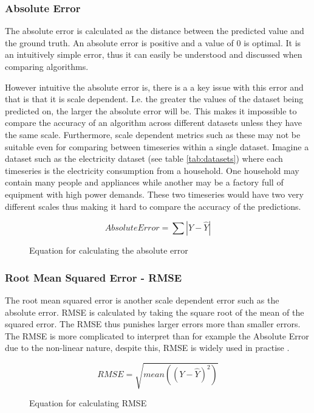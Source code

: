 \subsubsection{Absolute Error}
The absolute error is calculated as the distance between the predicted value and the ground truth. An absolute error is positive and a value of 0 is optimal. It is an intuitively simple error, thus it can easily be understood and discussed when comparing algorithms.

However intuitive the absolute error is, there is a a key issue with this error and that is that it is scale dependent. I.e. the greater the values of the dataset being predicted on, the larger the absolute error will be. This makes it impossible to compare the accuracy of an algorithm across different datasets unless they have the same scale. \cite{hyndman_forecasting_3rd} Furthermore, scale dependent metrics such as these may not be suitable even for comparing between timeseries within a single dataset. Imagine a dataset such as the electricity dataset (see table \ref{tab:datasets}) where each timeseries is the electricity consumption from a household. One household may contain many people and appliances while another may be a factory full of equipment with high power demands. These two timeseries would have two very different scales thus making it hard to compare the accuracy of the predictions.

\begin{figure}[h]
  \[Absolute Error = \sum|Y - \hat{Y}|\]
  \caption{Equation for calculating the absolute error}
  \label{eq:abs_error}
\end{figure}

\subsubsection{Root Mean Squared Error - RMSE}
\label{sec:RMSE}
The root mean squared error is another scale dependent error such as the absolute error. RMSE is calculated by taking the square root of the mean of the squared error. The RMSE thus punishes larger errors more than smaller errors. The RMSE is more complicated to interpret than for example the Absolute Error due to the non-linear nature, despite this, RMSE is widely used in practise \cite{hyndman_forecasting_3rd,gluonts-github}.

\begin{figure}[h]
  \[RMSE = \sqrt{mean((Y - \hat{Y})^2)}\]
  \caption{Equation for calculating RMSE}
  \label{eq:RMSE}
\end{figure}

